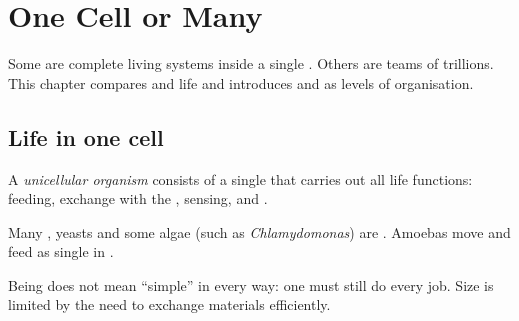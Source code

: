 \chapter{One Cell or Many}\label{ch:g6:uni-multi}

Some  are complete living systems inside a single . Others
are teams of trillions. This chapter compares  and
 life and introduces  and  as levels of
organisation.

\section{Life in one cell}

\begin{definition}\label{def:g6:uni-multi:uni}
A \emph{unicellular organism} consists of a
single  that carries out all life functions: feeding, exchange with
the , sensing, and .
\end{definition}

\begin{example}\label{ex:g6:uni-multi:examples}
Many , yeasts and some algae (such as \emph{Chlamydomonas}) are
. Amoebas move and feed as single  in  .
\end{example}

\begin{proposition}\label{prop:g6:uni-multi:complete}
Being  does not mean ``simple'' in every way: one  must
still do every job. Size is limited by the need to exchange materials
efficiently.
\end{proposition}
\admitted


